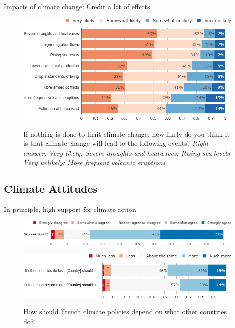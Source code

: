 \begin{framefont}{\small}
\begin{frame}{Impacts of climate change: Credit a lot of effects}%
\begin{figure}[h!]
\centering
\caption{If nothing is done to limit climate change, how likely do you think it is that climate change will lead to the following events?
\newline\footnotesize{\textit{Right answer: Very likely: Severe droughts and heatwaves; Rising sea levels \\ Very unlikely: More frequent volcanic eruptions}}}
\includegraphics[width=.74\paperwidth]{../figures/FR/CC_impacts_FR.png} \\
\end{figure}
\end{frame}

\subsection{Climate Attitudes}

\begin{frame}{In principle, high support for climate action}%
\begin{figure}[h!]
\centering
\caption{Do you agree or disagree with the following statement: ``France should take measures to fight climate change."}
\includegraphics[width=.87\paperwidth]{../figures/FR/should_fight_CC_FR.png} \\
\vspace{1cm}
\caption{How should French climate policies depend on what other countries do?}
\includegraphics[width=.87\paperwidth]{../figures/FR/if_other_do_FR.png} \\
\end{figure}
\end{frame}



\end{framefont}
